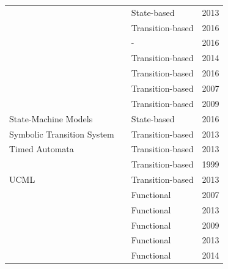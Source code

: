 \documentclass{report}
\begin{document}
\begin{table}[!h]
\begin{tabular}{|l|l|l|l|}
                                        & \cite{Sridhar2013}      & State-based          & 2013          \\ \cline{2-4}
                                        & \cite{Ganesan2016}      & Transition-based     & 2016          \\ \cline{2-4}
                                        & \cite{SanMiguel2016}    & -                    & 2016          \\ \cline{2-4}
                                        & \cite{Arantes2014}      & Transition-based     & 2014          \\ \cline{2-4}
                                        & \cite{Gay2016}          & Transition-based     & 2016          \\ \cline{2-4}
                                        & \cite{Hessel2007}       & Transition-based     & 2007          \\ \cline{2-4}
                                        & \cite{Hierons2009}      & Transition-based     & 2009          \\ \cline{2-4}
\multirow{-9}{*}{State-Machine Models}  & \cite{Jeong2016}        & State-based          & 2016          \\ \hline
Symbolic Transition System              & \cite{Anisetti2013}     & Transition-based     & 2013          \\ \hline
Timed Automata                          & \cite{Anand2013}        & Transition-based     & 2013          \\ \hline
                                         & \cite{Barber1999}       & Transition-based     & 1999          \\
\multirow{-2}{*}{UCML} &
\cite{Wang2013}    & Transition-based           & 2013          \\ \hline
                                        & \cite{XinyingCai2007}   & Functional           & 2007          \\ \cline{2-4}
                                        & \cite{Shirole2013}      & Functional           & 2013          \\ \cline{2-4}
                                        & \cite{Rauf2009}         & Functional           & 2009          \\ \cline{2-4}
                                        & \cite{Schaefer2013}     & Functional           & 2013          \\ \cline{2-4}
                                        & \cite{Paper2014}        & Functional           & 2014          \\ \cline{2-4}

\end{tabular}
\end{table}
\end{document}
